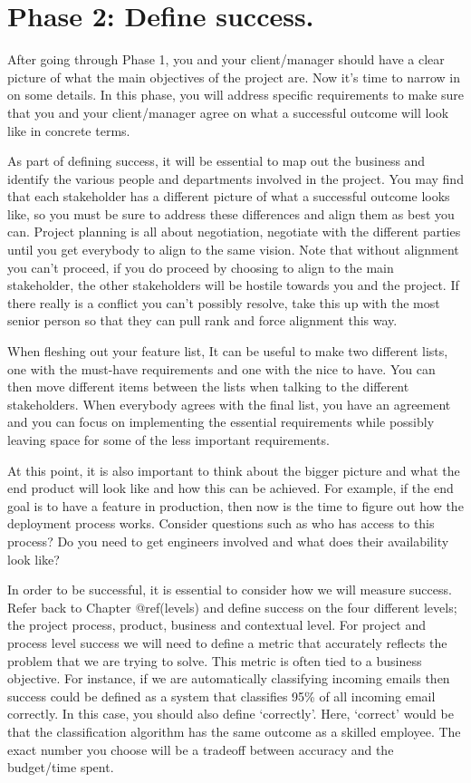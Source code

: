 \documentclass[
]{book}
\begin{document}
\hypertarget{phase-2-define-success.}{%
\section{Phase 2: Define success.}\label{phase-2-define-success.}}

After going through Phase 1, you and your client/manager should have a
clear picture of what the main objectives of the project are. Now it's
time to narrow in on some details. In this phase, you will address
specific requirements to make sure that you and your client/manager
agree on what a successful outcome will look like in concrete terms.

As part of defining success, it will be essential to map out the
business and identify the various people and departments involved in the
project. You may find that each stakeholder has a different picture of
what a successful outcome looks like, so you must be sure to address
these differences and align them as best you can. Project planning is
all about negotiation, negotiate with the different parties until you
get everybody to align to the same vision. Note that without alignment
you can't proceed, if you do proceed by choosing to align to the main
stakeholder, the other stakeholders will be hostile towards you and the
project. If there really is a conflict you can't possibly resolve, take
this up with the most senior person so that they can pull rank and force
alignment this way.

When fleshing out your feature list, It can be useful to make two
different lists, one with the must-have requirements and one with the
nice to have. You can then move different items between the lists when
talking to the different stakeholders. When everybody agrees with the
final list, you have an agreement and you can focus on implementing the
essential requirements while possibly leaving space for some of the less
important requirements.

At this point, it is also important to think about the bigger picture
and what the end product will look like and how this can be achieved.
For example, if the end goal is to have a feature in production, then
now is the time to figure out how the deployment process works. Consider
questions such as who has access to this process? Do you need to get
engineers involved and what does their availability look like?

In order to be successful, it is essential to consider how we will
measure success. Refer back to Chapter @ref(levels) and define success
on the four different levels; the project process, product, business and
contextual level. For project and process level success we will need to
define a metric that accurately reflects the problem that we are trying
to solve. This metric is often tied to a business objective. For
instance, if we are automatically classifying incoming emails then
success could be defined as a system that classifies 95\% of all
incoming email correctly. In this case, you should also define
`correctly'. Here, `correct' would be that the classification algorithm
has the same outcome as a skilled employee. The exact number you choose
will be a tradeoff between accuracy and the budget/time spent.
\end{document}
